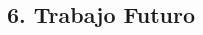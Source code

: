 \begin{spacing}{1.5}
\begin{tightcenter}
\section{6. Trabajo Futuro}
\mylinespacing
\end{tightcenter}

\mylinespacing
\mylinespacing
\begin{tightcenter}
\end{tightcenter}
\end{spacing}
